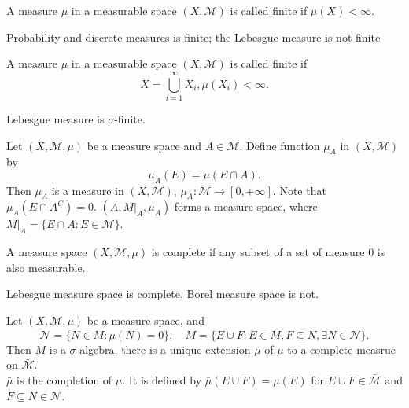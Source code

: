 \documentclass[class=book, crop=false]{standalone}
\begin{document}
        \begin{definition}
            A measure $\mu$ in a measurable space $(X, \mathscr{M})$ is called finite if $\mu(X) < \infty$.
        \end{definition}
        \begin{remark}
            Probability and discrete measures is finite; the Lebesgue measure is not finite
        \end{remark}

        \begin{definition}
            A measure $\mu$ in a measurable space $(X, \mathscr{M})$ is called finite if
            \begin{equation*}
                X = \bigcup^{\infty}_{i = 1} X_i, \mu(X_i) < \infty.
            \end{equation*}
        \end{definition}
        \begin{remark}
            Lebesgue measure is $\sigma$-finite.
        \end{remark}

        \begin{definition}[Restriction]
            Let $(X, \mathscr{M}, \mu)$ be a measure space and $A \in \mathscr{M}$. Define function $\mu_A$ in $(X, \mathscr{M})$ by
            \begin{equation*}
                \mu_A(E) = \mu(E \cap A).
            \end{equation*}
            Then $\mu_A$ is a measure in $(X, \mathscr{M})$, $\mu_A : \mathscr{M} \rightarrow [0, +\infty]$. Note that $\mu_A(E \cap A^C) = 0$. $(A, M|_A, \mu_A)$ forms a measure space, where $M|_A = \{E \cap A : E \in \mathscr{M}\}$.
        \end{definition}

        \begin{definition}
            A measure space $(X, \mathscr{M}, \mu)$ is complete if any subset of a set of measure $0$ is also measurable.
        \end{definition}
        \begin{remark}
            Lebesgue measure space is complete. Borel measure space is not.
        \end{remark}

        \begin{theorem}
            Let $(X, \mathscr{M}, \mu)$ be a measure space, and
            \begin{equation*}
                \mathscr{N} = \{N \in M : \mu(N) = 0\}, \quad \bar{M} = \{E \cup F : E \in M, F \subseteq N, \exists N \in \mathscr{N}\}.
            \end{equation*}
            Then $\bar{M}$ is a $\sigma$-algebra, there is a unique extension $\bar{\mu}$ of $\mu$ to a complete measrue on $\bar{\mathscr{M}}$. \\
            $\bar{\mu}$ is the completion of $\mu$. It is defined by $\bar{\mu}(E \cup F) = \mu(E)$ for $E \cup F \in \bar{\mathscr{M}}$ and $F \subseteq N \in \mathscr{N}$.
        \end{theorem}
\end{document}
